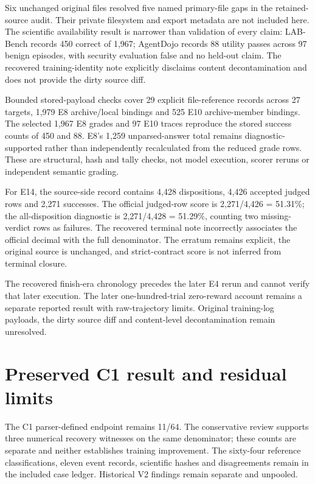 \documentclass[12pt,a4paper]{report}
\begin{document}
Six unchanged original files resolved five named primary-file gaps in
the retained-source audit. Their private filesystem and export metadata
are not included here. The scientific availability result is narrower
than validation of every claim: LAB-Bench records 450 correct of 1,967;
AgentDojo records 88 utility passes across 97 benign episodes, with
security evaluation false and no held-out claim. The recovered
training-identity note explicitly disclaims content decontamination and
does not provide the dirty source diff.

Bounded stored-payload checks cover 29 explicit file-reference records
across 27 targets, 1,979 E8 archive/local bindings and 525 E10
archive-member bindings. The selected 1,967 E8 grades and 97 E10 traces
reproduce the stored success counts of 450 and 88. E8's 1,259
unparsed-answer total remains diagnostic-supported rather than
independently recalculated from the reduced grade rows. These are
structural, hash and tally checks, not model execution, scorer reruns or
independent semantic grading.

For E14, the source-side record contains 4,428 dispositions, 4,426
accepted judged rows and 2,271 successes. The official judged-row score
is 2,271/4,426 = 51.31\%; the all-disposition diagnostic is 2,271/4,428
= 51.29\%, counting two missing-verdict rows as failures. The recovered
terminal note incorrectly associates the official decimal with the full
denominator. The erratum remains explicit, the original source is
unchanged, and strict-contract score is not inferred from terminal
closure.

The recovered finish-era chronology precedes the later E4 rerun and
cannot verify that later execution. The later one-hundred-trial
zero-reward account remains a separate reported result with
raw-trajectory limits. Original training-log payloads, the dirty source
diff and content-level decontamination remain unresolved.

\section{Preserved C1 result and residual
limits}\label{preserved-c1-result-and-residual-limits}

The C1 parser-defined endpoint remains 11/64. The conservative review
supports three numerical recovery witnesses on the same denominator;
these counts are separate and neither establishes training improvement.
The sixty-four reference classifications, eleven event records,
scientific hashes and disagreements remain in the included case ledger.
Historical V2 findings remain separate and unpooled.
\end{document}
